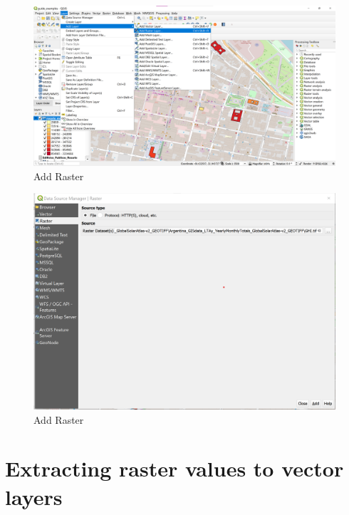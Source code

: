 \documentclass[
]{book}
\begin{document}
\begin{figure}

{\centering \includegraphics[width=1\linewidth]{images/addraster} 

}

\caption{Add Raster}\label{fig:img-17}
\end{figure}
\begin{figure}

{\centering \includegraphics[width=1\linewidth]{images/addraster2} 

}

\caption{Add Raster}\label{fig:img-171}
\end{figure}

\hypertarget{extracting-raster-values-to-vector-layers}{%
\section{Extracting raster values to vector layers}\label{extracting-raster-values-to-vector-layers}}
\end{document}
